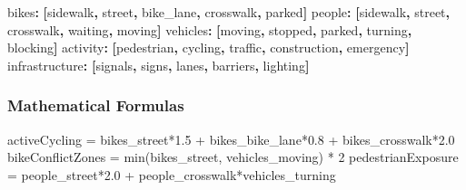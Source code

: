 \documentclass[
  letterpaper,
  DIV=11,
  numbers=noendperiod]{scrartcl}
\newenvironment{Shaded}{\begin{snugshade}}{\end{snugshade}}
\newcommand{\AttributeTok}[1]{\textcolor[rgb]{0.40,0.45,0.13}{#1}}
\newcommand{\DecValTok}[1]{\textcolor[rgb]{0.68,0.00,0.00}{#1}}
\newcommand{\FloatTok}[1]{\textcolor[rgb]{0.68,0.00,0.00}{#1}}
\newcommand{\FunctionTok}[1]{\textcolor[rgb]{0.28,0.35,0.67}{#1}}
\newcommand{\KeywordTok}[1]{\textcolor[rgb]{0.00,0.23,0.31}{\textbf{#1}}}
\newcommand{\NormalTok}[1]{\textcolor[rgb]{0.00,0.23,0.31}{#1}}
\newcommand{\OperatorTok}[1]{\textcolor[rgb]{0.37,0.37,0.37}{#1}}
\begin{document}
\begin{Shaded}
\begin{Highlighting}[]
\FunctionTok{bikes}\KeywordTok{:}\AttributeTok{ }\KeywordTok{[}\AttributeTok{sidewalk}\KeywordTok{,}\AttributeTok{ street}\KeywordTok{,}\AttributeTok{ bike\_lane}\KeywordTok{,}\AttributeTok{ crosswalk}\KeywordTok{,}\AttributeTok{ parked}\KeywordTok{]}
\FunctionTok{people}\KeywordTok{:}\AttributeTok{ }\KeywordTok{[}\AttributeTok{sidewalk}\KeywordTok{,}\AttributeTok{ street}\KeywordTok{,}\AttributeTok{ crosswalk}\KeywordTok{,}\AttributeTok{ waiting}\KeywordTok{,}\AttributeTok{ moving}\KeywordTok{]}
\FunctionTok{vehicles}\KeywordTok{:}\AttributeTok{ }\KeywordTok{[}\AttributeTok{moving}\KeywordTok{,}\AttributeTok{ stopped}\KeywordTok{,}\AttributeTok{ parked}\KeywordTok{,}\AttributeTok{ turning}\KeywordTok{,}\AttributeTok{ blocking}\KeywordTok{]}
\FunctionTok{activity}\KeywordTok{:}\AttributeTok{ }\KeywordTok{[}\AttributeTok{pedestrian}\KeywordTok{,}\AttributeTok{ cycling}\KeywordTok{,}\AttributeTok{ traffic}\KeywordTok{,}\AttributeTok{ construction}\KeywordTok{,}\AttributeTok{ emergency}\KeywordTok{]}
\FunctionTok{infrastructure}\KeywordTok{:}\AttributeTok{ }\KeywordTok{[}\AttributeTok{signals}\KeywordTok{,}\AttributeTok{ signs}\KeywordTok{,}\AttributeTok{ lanes}\KeywordTok{,}\AttributeTok{ barriers}\KeywordTok{,}\AttributeTok{ lighting}\KeywordTok{]}
\end{Highlighting}
\end{Shaded}

\subsubsection{Mathematical Formulas}\label{mathematical-formulas}

\begin{Shaded}
\begin{Highlighting}[]
\NormalTok{activeCycling }\OperatorTok{=}\NormalTok{ bikes\_street}\OperatorTok{*}\FloatTok{1.5} \OperatorTok{+}\NormalTok{ bikes\_bike\_lane}\OperatorTok{*}\FloatTok{0.8} \OperatorTok{+}\NormalTok{ bikes\_crosswalk}\OperatorTok{*}\FloatTok{2.0}
\NormalTok{bikeConflictZones }\OperatorTok{=} \FunctionTok{min}\NormalTok{(bikes\_street}\OperatorTok{,}\NormalTok{ vehicles\_moving) }\OperatorTok{*} \DecValTok{2}
\NormalTok{pedestrianExposure }\OperatorTok{=}\NormalTok{ people\_street}\OperatorTok{*}\FloatTok{2.0} \OperatorTok{+}\NormalTok{ people\_crosswalk}\OperatorTok{*}\NormalTok{vehicles\_turning}
\end{Highlighting}
\end{Shaded}
\end{document}
